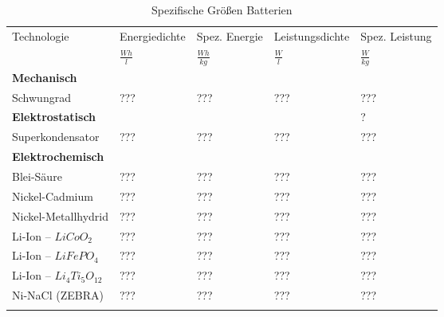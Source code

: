 \begin{table}\centering
	\begin{tabularx}{\linewidth}{lllll}
		\toprule
		\multirow{2}{*}{Technologie} & Energiedichte  & Spez. Energie   & Leistungsdichte & Spez. Leistung \\
		                             & $\frac{Wh}{l}$ & $\frac{Wh}{kg}$ & $\frac{W}{l}$   & $\frac{W}{kg}$ \\ \midrule
		\textbf{Mechanisch}          &                &                 &                 &  \\
		Schwungrad                   & ???            & ???             & ???             & ???            \\
		\textbf{Elektrostatisch}     &                &                 &                 & ?              \\
		Superkondensator             & ???            & ???             & ???             & ???            \\
		\textbf{Elektrochemisch}     &                &                 &                 &  \\
		Blei-Säure                   & ???            & ???             & ???             & ???            \\
		Nickel-Cadmium               & ???            & ???             & ???             & ???            \\
		Nickel-Metallhydrid          & ???            & ???             & ???             & ???            \\
		Li-Ion -- $LiCoO_2$          & ???            & ???             & ???             & ???            \\
		Li-Ion -- $LiFePO_4$         & ???            & ???             & ???             & ???            \\
		Li-Ion -- $Li_4Ti_5O_{12}$   & ???            & ???             & ???             & ???            \\
		Ni-NaCl (ZEBRA)              & ???            & ???             & ???             & ???            \\ \bottomrule
		                             &
	\end{tabularx}
	\caption{Spezifische Größen Batterien}
	\label{hierdoof}
\end{table}
